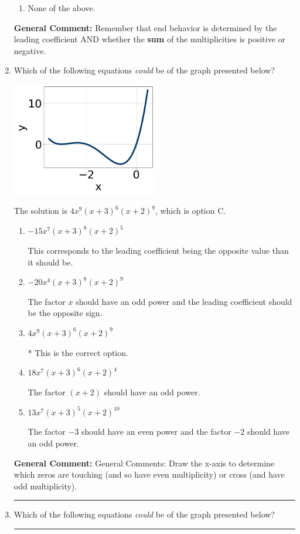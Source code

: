 \documentclass{extbook}[14pt]
\newcommand{\litem}[1]{\item #1

\rule{\textwidth}{0.4pt}}
\begin{document}
\begin{enumerate}
{\begin{enumerate}[label=\Alph*.]
\begin{multicols}{2}
\end{multicols}\item None of the above.\end{enumerate}
\textbf{General Comment:} Remember that end behavior is determined by the leading coefficient AND whether the \textbf{sum} of the multiplicities is positive or negative.
}
\litem{
Which of the following equations \textit{could} be of the graph presented below?

\begin{center}
    \includegraphics[width=0.5\textwidth]{../Figures/polyGraphToFunctionCopyA.png}
\end{center}



The solution is \( 4x^{9} (x + 3)^{6} (x + 2)^{9} \), which is option C.\begin{enumerate}[label=\Alph*.]
\item \( -15x^{7} (x + 3)^{8} (x + 2)^{5} \)

This corresponds to the leading coefficient being the opposite value than it should be.
\item \( -20x^{4} (x + 3)^{8} (x + 2)^{9} \)

The factor $x$ should have an odd power and the leading coefficient should be the opposite sign.
\item \( 4x^{9} (x + 3)^{6} (x + 2)^{9} \)

* This is the correct option.
\item \( 18x^{7} (x + 3)^{6} (x + 2)^{4} \)

The factor $(x + 2)$ should have an odd power.
\item \( 13x^{7} (x + 3)^{5} (x + 2)^{10} \)

The factor $-3$ should have an even power and the factor $-2$ should have an odd power.
\end{enumerate}

\textbf{General Comment:} General Comments: Draw the x-axis to determine which zeros are touching (and so have even multiplicity) or cross (and have odd multiplicity).
}
\litem{
Which of the following equations \textit{could} be of the graph presented below?

}
\end{enumerate}
\end{document}
